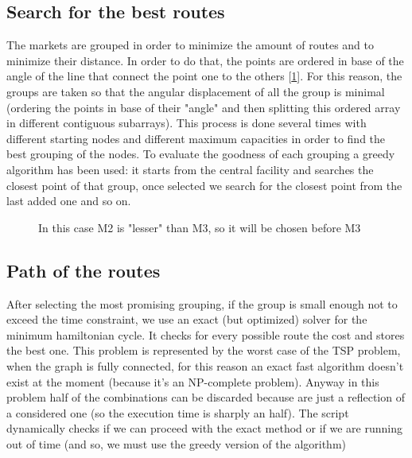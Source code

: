 \documentclass[11pt]{article} %
\begin{document}
\subsection{Search for the best routes}
The markets are grouped in order to minimize the amount of routes and to minimize their distance. In order to do that, the points are ordered in base of the angle of the line that connect the point one to the others [\ref{fig:angle ordering}]. For this reason, the groups are taken so that the angular displacement of all the group is minimal (ordering the points in base of their "angle" and then splitting this ordered array in different contiguous subarrays). This process is done several times with different starting nodes and different maximum capacities in order to find the best grouping of the nodes. To evaluate the goodness of each grouping a greedy algorithm has been used: it starts from the central facility and searches the closest point of that group, once selected we search for the closest point from the last added one and so on. 
\begin{figure}[h]
    \centering
    \qquad
    \caption{In this case M2 is "lesser" than M3, so it will be chosen before M3}%
    \label{fig:angle ordering}%
\end{figure}

\subsection{Path of the routes}
After selecting the most promising grouping, if the group is small enough not to exceed the time constraint, we use an exact (but optimized) solver for the minimum hamiltonian cycle. It checks for every possible route the cost and stores the best one. This problem is represented by the worst case of the TSP problem, when the graph is fully connected, for this reason an exact fast algorithm doesn't exist at the moment (because it's an NP-complete problem). Anyway in this problem half of the combinations can be discarded because are just a reflection of a considered one (so the execution time is sharply an half). The script dynamically checks if we can proceed with the exact method or if we are running out of time (and so, we must use the greedy version of the algorithm)
\end{document}
